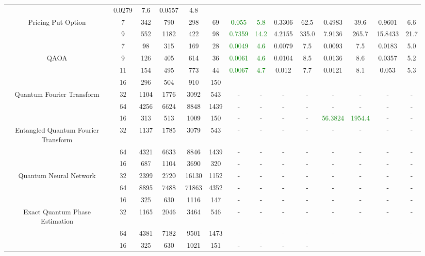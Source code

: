 \begin{table}[htb]
{\begin{tabular}{|c|c|c|c|c|c|c|c|c|c|c|c|c|c|}
 & 0.0279 & 7.6
 & 0.0557 & 4.8
 \\
Pricing Put Option & 
7 & 342 & 790 & 298 & 69
 & \textcolor{green}{0.055} & \textcolor{green}{5.8}
 & 0.3306 & 62.5
 & 0.4983 & 39.6
 & 0.9601 & 6.6
 \\
 & 
9 & 552 & 1182 & 422 & 98
 & \textcolor{green}{0.7359} & \textcolor{green}{14.2}
 & 4.2155 & 335.0
 & 7.9136 & 265.7
 & 15.8433 & 21.7
 \\
\hline
 & 
7 & 98 & 315 & 169 & 28
 & \textcolor{green}{0.0049} & \textcolor{green}{4.6}
 & 0.0079 & 7.5
 & 0.0093 & 7.5
 & 0.0183 & 5.0
 \\
QAOA & 
9 & 126 & 405 & 614 & 36
 & \textcolor{green}{0.0061} & \textcolor{green}{4.6}
 & 0.0104 & 8.5
 & 0.0136 & 8.6
 & 0.0357 & 5.2
 \\
 & 
11 & 154 & 495 & 773 & 44
 & \textcolor{green}{0.0067} & \textcolor{green}{4.7}
 & 0.012 & 7.7
 & 0.0121 & 8.1
 & 0.053 & 5.3
 \\
\hline
 & 
16 & 296 & 504 & 910 & 150
 & - & -
 & - & -
 & - & -
 & - & -
 \\
Quantum Fourier Transform & 
32 & 1104 & 1776 & 3092 & 543
 & - & -
 & - & -
 & - & -
 & - & -
 \\
 & 
64 & 4256 & 6624 & 8848 & 1439
 & - & -
 & - & -
 & - & -
 & - & -
 \\
\hline
 & 
16 & 313 & 513 & 1009 & 150
 & - & -
 & - & -
 & \textcolor{green}{56.3824} & \textcolor{green}{1954.4}
 & - & -
 \\
Entangled Quantum Fourier Transform & 
32 & 1137 & 1785 & 3079 & 543
 & - & -
 & - & -
 & - & -
 & - & -
 \\
 & 
64 & 4321 & 6633 & 8846 & 1439
 & - & -
 & - & -
 & - & -
 & - & -
 \\
\hline
 & 
16 & 687 & 1104 & 3690 & 320
 & - & -
 & - & -
 & - & -
 & - & -
 \\
Quantum Neural Network & 
32 & 2399 & 2720 & 16130 & 1152
 & - & -
 & - & -
 & - & -
 & - & -
 \\
 & 
64 & 8895 & 7488 & 71863 & 4352
 & - & -
 & - & -
 & - & -
 & - & -
 \\
\hline
 & 
16 & 325 & 630 & 1116 & 147
 & - & -
 & - & -
 & - & -
 & - & -
 \\
Exact Quantum Phase Estimation & 
32 & 1165 & 2046 & 3464 & 546
 & - & -
 & - & -
 & - & -
 & - & -
 \\
 & 
64 & 4381 & 7182 & 9501 & 1473
 & - & -
 & - & -
 & - & -
 & - & -
 \\
\hline
 & 
16 & 325 & 630 & 1021 & 151
 & - & -
 & - & -

\end{tabular}}
\end{table}

